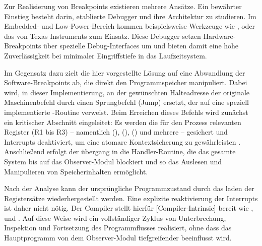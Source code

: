 Zur Realisierung von Breakpoints existieren mehrere Ans\"atze. Ein bew\"ahrter Einstieg besteht darin, etablierte Debugger und ihre Architektur zu studieren. Im Embedded‑ und Low‑Power‑Bereich kommen beispielsweise Werkzeuge wie ,  oder das  von Texas Instruments zum Einsatz. Diese Debugger setzen Hardware-Breakpoints \"uber spezielle Debug‑Interfaces um und bieten damit eine hohe Zuverl\"assigkeit bei minimaler Eingriffstiefe in das Laufzeitsystem.

Im Gegensatz dazu zielt die hier vorgestellte L\"osung auf eine Abwandlung der Software-Breakpoints ab, die direkt den Programmspeicher manipuliert. Dabei wird, in dieser Implementierung, an der gew\"unschten Halteadresse der originale Maschinenbefehl durch einen Sprungbefehl (Jump) ersetzt, der auf eine speziell implementierte -Routine verweist. Beim Erreichen dieses Befehls wird zun\"achst ein kritischer Abschnitt eingeleitet: Es werden die f\"ur den Prozess relevanten Register (R1 bis R3) – namentlich  (),  (),  () und \ggf mehrere  – gesichert und Interrupts deaktiviert, um eine atomare Kontextsicherung zu gew\"ahrleisten . Anschlie{\ss}end erfolgt der \"ubergang in die Handler-Routine, die das gesamte System bis auf das Observer-Modul blockiert und so das Auslesen und Manipulieren von Speicherinhalten erm\"oglicht.

Nach der Analyse kann der urspr\"ungliche Programmzustand durch das laden der Registers\"atze wiederhergestellt werden. Eine explizite reaktivierung der Interrupts ist daher nicht n\"otig. Der Compiler stellt hierf\"ur [Compiler-Intrinsic] bereit wie ,  und  . Auf diese Weise wird ein vollst\"andiger Zyklus von Unterbrechung, Inspektion und Fortsetzung des Programmflusses realisiert, ohne dass das Hauptprogramm von dem Observer-Modul tiefgreifender beeinflusst wird.

